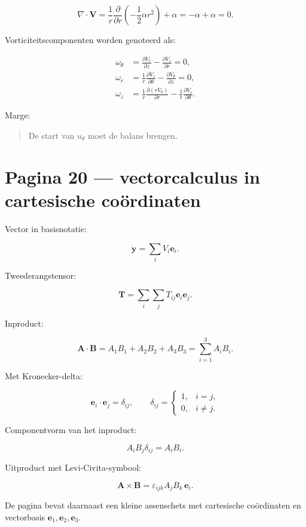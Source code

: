 \documentclass[11pt,a4paper]{article}
\newcommand{\vect}[1]{\mathbf{#1}}
\begin{document}
$$
\nabla\cdot\vect{V}
=
\frac{1}{r}\frac{\partial}{\partial r}
\left(-\frac{1}{2}\alpha r^2\right)
+
\alpha
=
-\alpha+\alpha
=
0.
$$

Vorticiteitscomponenten worden genoteerd als:

$$
\begin{aligned}
\omega_\theta
&=
\frac{\partial V_r}{\partial z}
-
\frac{\partial V_z}{\partial r}
=
0,\\
\omega_r
&=
\frac{1}{r}\frac{\partial V_z}{\partial\theta}
-
\frac{\partial V_\theta}{\partial z}
=
0,\\
\omega_z
&=
\frac{1}{r}\frac{\partial(rV_\theta)}{\partial r}
-
\frac{1}{r}\frac{\partial V_r}{\partial\theta}.
\end{aligned}
$$

Marge:

\begin{quote}
De start van $u_\theta$ moet de balans brengen.
\end{quote}

\newpage

\section*{Pagina 20 --- vectorcalculus in cartesische coördinaten}
Vector in basisnotatie:

$$
\vect{y}
=
\sum_i V_i\vect{e}_i.
$$

Tweederangstensor:

$$
\vect{T}
=
\sum_i\sum_j
T_{ij}\vect{e}_i\vect{e}_j.
$$

Inproduct:

$$
\vect{A}\cdot\vect{B}
=
A_1B_1+A_2B_2+A_3B_3
=
\sum_{i=1}^{3}A_iB_i.
$$

Met Kronecker-delta:

$$
\vect{e}_i\cdot\vect{e}_j
=
\delta_{ij},
\qquad
\delta_{ij}
=
\begin{cases}
1, & i=j,\\
0, & i\neq j.
\end{cases}
$$

Componentvorm van het inproduct:

$$
A_iB_j\delta_{ij}
=
A_iB_i.
$$

Uitproduct met Levi-Civita-symbool:

$$
\vect{A}\times\vect{B}
=
\varepsilon_{ijk}A_jB_k\,\vect{e}_i.
$$

De pagina bevat daarnaast een kleine assenschets met cartesische coördinaten en vectorbasis $\vect{e}_1,\vect{e}_2,\vect{e}_3$.
\end{document}
